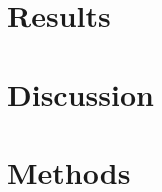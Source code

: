 \documentclass[11pt]{article}
\title{\todo{Title}}
\author[1]{\todo{Student}}
\author[1]{\todo{PI}}
\affil[1]{\todo{Affiliation}}
\date{}
\begin{document}
\maketitle

\begin{abstract}

\end{abstract}



\section*{Results}

\section*{Discussion}

\section*{Methods}




\end{document}
